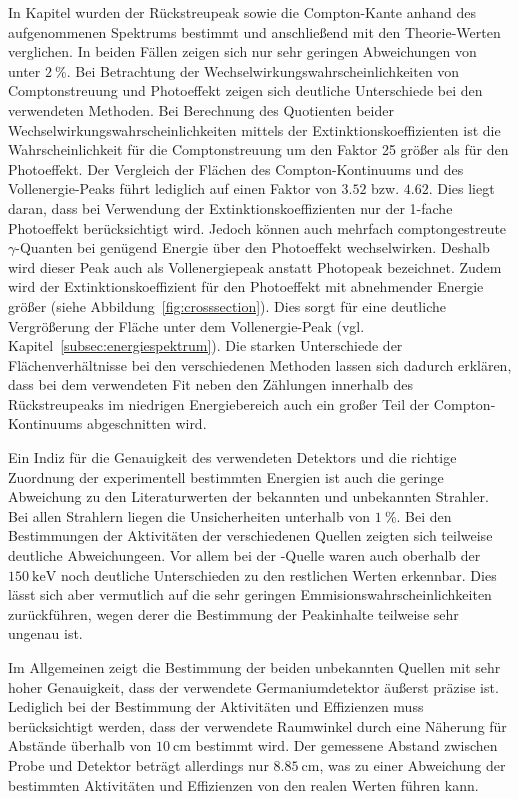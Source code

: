 In Kapitel \label{subsubsec:P} wurden der Rückstreupeak sowie die Compton-Kante
anhand des aufgenommenen Spektrums bestimmt und anschließend mit den Theorie-Werten
verglichen. In beiden Fällen zeigen sich nur sehr geringen Abweichungen von
unter $\SI{2}{\percent}$.
Bei Betrachtung der Wechselwirkungswahrscheinlichkeiten von Comptonstreuung und
Photoeffekt zeigen sich deutliche Unterschiede
bei den verwendeten Methoden. Bei Berechnung des Quotienten beider
Wechselwirkungswahrscheinlichkeiten mittels der Extinktionskoeffizienten
ist die Wahrscheinlichkeit für die Comptonstreuung um den Faktor 25 größer als
für den Photoeffekt. Der Vergleich der Flächen des Compton-Kontinuums und des
Vollenergie-Peaks führt lediglich auf einen Faktor von $\num{3.52}$
bzw. $\num{4.62}$. Dies liegt daran, dass bei Verwendung der Extinktionskoeffizienten
nur der 1-fache Photoeffekt berücksichtigt wird. Jedoch können auch mehrfach
comptongestreute $\gamma$-Quanten bei genügend Energie über den Photoeffekt wechselwirken.
Deshalb wird dieser Peak auch als Vollenergiepeak anstatt Photopeak bezeichnet.
Zudem wird der Extinktionskoeffizient für den Photoeffekt mit abnehmender Energie
größer (siehe Abbildung~\ref{fig:crosssection}). Dies sorgt für eine deutliche
Vergrößerung der Fläche unter dem Vollenergie-Peak (vgl. Kapitel~\ref{subsec:energiespektrum}).
Die starken Unterschiede der Flächenverhältnisse bei den verschiedenen Methoden
lassen sich dadurch erklären, dass bei dem verwendeten Fit neben den Zählungen
innerhalb des Rückstreupeaks im niedrigen Energiebereich auch ein großer
Teil der Compton-Kontinuums abgeschnitten wird.

Ein Indiz für die Genauigkeit des verwendeten Detektors und die richtige
Zuordnung der experimentell bestimmten Energien ist auch die
geringe Abweichung zu den Literaturwerten der bekannten und
unbekannten Strahler. Bei allen Strahlern liegen die Unsicherheiten unterhalb
von $\SI{1}{\percent}$. Bei den Bestimmungen der Aktivitäten der verschiedenen
Quellen zeigten sich teilweise deutliche Abweichungeen. Vor allem bei der
-Quelle waren auch oberhalb der $\SI{150}{\kilo\eV}$ noch deutliche
Unterschieden zu den restlichen Werten erkennbar. Dies lässt sich aber vermutlich
auf die sehr geringen Emmisionswahrscheinlichkeiten zurückführen, wegen derer die
Bestimmung der Peakinhalte teilweise sehr ungenau ist.

Im Allgemeinen zeigt die Bestimmung der beiden unbekannten Quellen mit sehr hoher
Genauigkeit, dass der verwendete Germaniumdetektor äußerst präzise ist. Lediglich
bei der Bestimmung der Aktivitäten und Effizienzen muss berücksichtigt werden,
dass der verwendete
Raumwinkel durch eine Näherung für Abstände überhalb von $\SI{10}{\centi\meter}$
bestimmt wird. Der gemessene Abstand zwischen Probe und Detektor beträgt
allerdings nur $\SI{8.85}{\centi\meter}$, was zu einer Abweichung der
bestimmten Aktivitäten und Effizienzen von den realen Werten führen kann.

